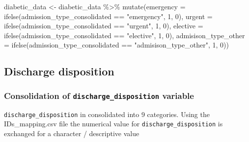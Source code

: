 \documentclass[
]{article}
\newenvironment{Shaded}{\begin{snugshade}}{\end{snugshade}}
\newcommand{\AttributeTok}[1]{\textcolor[rgb]{0.77,0.63,0.00}{#1}}
\newcommand{\DecValTok}[1]{\textcolor[rgb]{0.00,0.00,0.81}{#1}}
\newcommand{\FunctionTok}[1]{\textcolor[rgb]{0.00,0.00,0.00}{#1}}
\newcommand{\NormalTok}[1]{#1}
\newcommand{\OtherTok}[1]{\textcolor[rgb]{0.56,0.35,0.01}{#1}}
\newcommand{\SpecialCharTok}[1]{\textcolor[rgb]{0.00,0.00,0.00}{#1}}
\newcommand{\StringTok}[1]{\textcolor[rgb]{0.31,0.60,0.02}{#1}}
\begin{document}
\begin{Shaded}
\begin{Highlighting}[]
\NormalTok{diabetic\_data }\OtherTok{\textless{}{-}}\NormalTok{ diabetic\_data }\SpecialCharTok{\%\textgreater{}\%}
    \FunctionTok{mutate}\NormalTok{(}\AttributeTok{emergency =} \FunctionTok{ifelse}\NormalTok{(admission\_type\_consolidated }\SpecialCharTok{==}
        \StringTok{"emergency"}\NormalTok{, }\DecValTok{1}\NormalTok{, }\DecValTok{0}\NormalTok{), }\AttributeTok{urgent =} \FunctionTok{ifelse}\NormalTok{(admission\_type\_consolidated }\SpecialCharTok{==}
        \StringTok{"urgent"}\NormalTok{, }\DecValTok{1}\NormalTok{, }\DecValTok{0}\NormalTok{), }\AttributeTok{elective =} \FunctionTok{ifelse}\NormalTok{(admission\_type\_consolidated }\SpecialCharTok{==}
        \StringTok{"elective"}\NormalTok{, }\DecValTok{1}\NormalTok{, }\DecValTok{0}\NormalTok{), }\AttributeTok{admisison\_type\_other =} \FunctionTok{ifelse}\NormalTok{(admission\_type\_consolidated }\SpecialCharTok{==}
        \StringTok{"admisison\_type\_other"}\NormalTok{, }\DecValTok{1}\NormalTok{, }\DecValTok{0}\NormalTok{))}
\end{Highlighting}
\end{Shaded}

\hypertarget{discharge-disposition}{%
\subsection{Discharge disposition}\label{discharge-disposition}}

\hypertarget{consolidation-of-discharge_disposition-variable}{%
\subsubsection{\texorpdfstring{Consolidation of
\texttt{discharge\_disposition}
variable}{Consolidation of discharge\_disposition variable}}\label{consolidation-of-discharge_disposition-variable}}

\texttt{discharge\_disposition} in consolidated into 9 categories. Using
the IDs\_mapping.csv file the numerical value for
\texttt{discharge\_disposition} is exchanged for a character /
descriptive value
\end{document}
